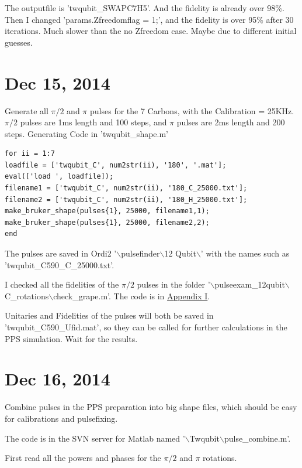 \documentclass[prl,onecolumn]{revtex4-1}
\newcommand{\dir}{$\backslash$}
\begin{document}
The outputfile is 'twqubit\_SWAPC7H5'. And the fidelity is already over 98\%. Then I changed 'params.Zfreedomflag = 1;', and the fidelity is over 95\% after 30 iterations. Much slower than the no Zfreedom case. Maybe due to different initial guesses.

\newpage

\section{Dec 15, 2014}

Generate all $\pi/2$ and $\pi$ pulses for the 7 Carbons, with the Calibration = 25KHz. $\pi/2$ pulses are 1ms length and 100 steps, and $\pi$ pulses are 2ms length and 200 steps. Generating Code in 'twqubit\_shape.m'

\begin{lstlisting}
for ii = 1:7
loadfile = ['twqubit_C', num2str(ii), '180', '.mat'];
eval(['load ', loadfile]);
filename1 = ['twqubit_C', num2str(ii), '180_C_25000.txt'];
filename2 = ['twqubit_C', num2str(ii), '180_H_25000.txt'];
make_bruker_shape(pulses{1}, 25000, filename1,1);
make_bruker_shape(pulses{1}, 25000, filename2,2);
end
\end{lstlisting}

The pulses are saved in Ordi2 '\dir pulsefinder\dir 12 Qubit\dir' with the names such as\\
'twqubit\_C590\_C\_25000.txt'.

I checked all the fidelities of the $\pi/2$ pulses in the folder '\dir pulseexam\_12qubit\dir C\_rotations\dir check\_grape.m'. The code is in \hyperlink{code:check_grape}{Appendix I}.

Unitaries and Fidelities of the pulses will both be saved in 'twqubit\_C590\_Ufid.mat', so they can be called for further calculations in the PPS simulation. Wait for the results.

\newpage
\section{Dec 16, 2014}
Combine pulses in the PPS preparation into big shape files, which should be easy for calibrations and pulsefixing.

The code is in the SVN server for Matlab named '\dir Twqubit\dir pulse\_combine.m'.

First read all the powers and phases for the $\pi/2$ and $\pi$ rotations.
\end{document}
